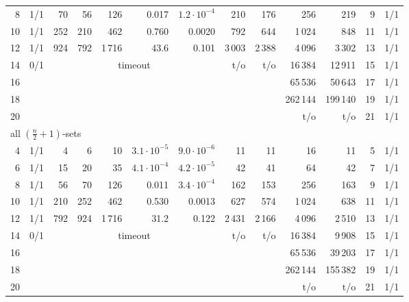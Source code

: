\begin{table}[p]
\begin{tabular}{r r r r r r r r r r r r r}
8 & 1/1 & 70 & 56 & 126 & 0.017 & $1.2{\cdot}10^{-4}$ & 210 & 176 & 256 & 219 & 9 & 1/1\\
10 & 1/1 & 252 & 210 & 462 & 0.760 & 0.0020 & 792 & 644 & 1\,024 & 848 & 11 & 1/1\\
12 & 1/1 & 924 & 792 & 1\,716 & 43.6 & 0.101 & 3\,003 & 2\,388 & 4\,096 & 3\,302 & 13 & 1/1\\
14 & 0/1 & \multicolumn{5}{c}{timeout} & t/o & t/o & 16\,384 & 12\,911 & 15 & 1/1\\
16 &  &  &  &  &  &  &  &  & 65\,536 & 50\,643 & 17 & 1/1\\
18 &  &  &  &  &  &  &  &  & 262\,144 & 199\,140 & 19 & 1/1\\
20 &  &  &  &  &  &  &  &  & t/o & t/o & 21 & 1/1\\
\midrule
\multicolumn{13}{l}{all $(\frac{n}{2}{+}1)$-sets}\\
4 & 1/1 & 4 & 6 & 10 & $3.1{\cdot}10^{-5}$ & $9.0{\cdot}10^{-6}$ & 11 & 11 & 16 & 11 & 5 & 1/1\\
6 & 1/1 & 15 & 20 & 35 & $4.1{\cdot}10^{-4}$ & $4.2{\cdot}10^{-5}$ & 42 & 41 & 64 & 42 & 7 & 1/1\\
8 & 1/1 & 56 & 70 & 126 & 0.011 & $3.4{\cdot}10^{-4}$ & 162 & 153 & 256 & 163 & 9 & 1/1\\
10 & 1/1 & 210 & 252 & 462 & 0.530 & 0.0013 & 627 & 574 & 1\,024 & 638 & 11 & 1/1\\
12 & 1/1 & 792 & 924 & 1\,716 & 31.2 & 0.122 & 2\,431 & 2\,166 & 4\,096 & 2\,510 & 13 & 1/1\\
14 & 0/1 & \multicolumn{5}{c}{timeout} & t/o & t/o & 16\,384 & 9\,908 & 15 & 1/1\\
16 &  &  &  &  &  &  &  &  & 65\,536 & 39\,203 & 17 & 1/1\\
18 &  &  &  &  &  &  &  &  & 262\,144 & 155\,382 & 19 & 1/1\\
20 &  &  &  &  &  &  &  &  & t/o & t/o & 21 & 1/1\\
\bottomrule
\end{tabular}
\end{table}
